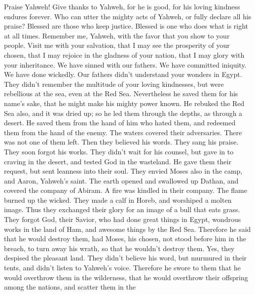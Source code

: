 Praise Yahweh! Give thanks to Yahweh, for he is good, for
his loving kindness endures forever.  Who can utter the
mighty acts of Yahweh, or fully declare all his praise? 
Blessed are those who keep justice. Blessed is one who does what is
right at all times.  Remember me, Yahweh, with the favor
that you show to your people. Visit me with your salvation, 
that I may see the prosperity of your chosen, that I may rejoice in the
gladness of your nation, that I may glory with your inheritance.
 We have sinned with our fathers. We have committed
iniquity. We have done wickedly.  Our fathers didn't
understand your wonders in Egypt. They didn't remember the multitude of
your loving kindnesses, but were rebellious at the sea, even at the Red
Sea.  Nevertheless he saved them for his name's sake, that
he might make his mighty power known.  He rebuked the Red
Sea also, and it was dried up; so he led them through the depths, as
through a desert.  He saved them from the hand of him who
hated them, and redeemed them from the hand of the enemy. 
The waters covered their adversaries. There was not one of them left.
 Then they believed his words. They sang his praise.
 They soon forgot his works. They didn't wait for his
counsel,  but gave in to craving in the desert, and tested
God in the wasteland.  He gave them their request, but sent
leanness into their soul.  They envied Moses also in the
camp, and Aaron, Yahweh's saint.  The earth opened and
swallowed up Dathan, and covered the company of Abiram.  A
fire was kindled in their company. The flame burned up the wicked.
 They made a calf in Horeb, and worshiped a molten image.
 Thus they exchanged their glory for an image of a bull
that eats grass.  They forgot God, their Savior, who had
done great things in Egypt,  wondrous works in the land of
Ham, and awesome things by the Red Sea.  Therefore he said
that he would destroy them, had Moses, his chosen, not stood before him
in the breach, to turn away his wrath, so that he wouldn't destroy them.
 Yes, they despised the pleasant land. They didn't believe
his word,  but murmured in their tents, and didn't listen
to Yahweh's voice.  Therefore he swore to them that he
would overthrow them in the wilderness,  that he would
overthrow their offspring among the nations, and scatter them in the
